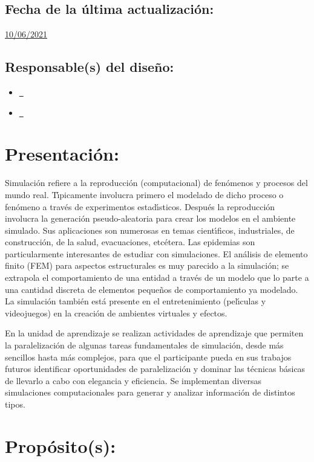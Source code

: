 \documentclass[10 pt]{article}
\begin{document}
\subsection{Fecha de la \'{u}ltima actualizaci\'{o}n:} \underline{10/06/2021}
\subsection{Responsable(s) del dise\~{n}o:}
\begin{itemize}[label={}]
\item \underline{\nsara~\sara}
\item \underline{\nelisa~\elisa}
\end{itemize}
\newpage
\section{Presentaci\'{o}n:}

Simulaci\'{o}n refiere a la reproducci\'{o}n (computacional) de
fen\'{o}menos y procesos del mundo real. T\'{\i}picamente involucra
primero el modelado de dicho proceso o fen\'{o}meno a trav\'{e}s de
experimentos estad\'{\i}sticos. Despu\'{e}s la reproducci\'{o}n
involucra la generaci\'{o}n pseudo-aleatoria para crear los modelos en
el ambiente simulado. Sus aplicaciones son numerosas en temas
cient\'{\i}ficos, industriales, de construcci\'{o}n, de la salud,
evacuaciones, etc\'{e}tera. Las epidemias son particularmente
interesantes de estudiar con simulaciones. El an\'{a}lisis de elemento
finito (FEM) para aspectos estructurales es muy parecido a la
simulaci\'{o}n; se extrapola el comportamiento de una entidad a
trav\'{e}s de un modelo que lo parte a una cantidad discreta de
elementos peque\~{n}os de comportamiento ya modelado. La
simulaci\'{o}n tambi\'{e}n est\'{a} presente en el entretenimiento
(pel\'{\i}culas y videojuegos) en la creaci\'{o}n de ambientes
virtuales y efectos.

En la unidad de aprendizaje se realizan actividades de aprendizaje que
permiten la paralelizaci\'{o}n de algunas tareas fundamentales de
simulaci\'{o}n, desde m\'{a}s sencillos hasta m\'{a}s complejos, para
que el participante pueda en sus trabajos futuros identificar
oportunidades de paralelizaci\'{o}n y dominar las t\'{e}cnicas
b\'{a}sicas de llevarlo a cabo con elegancia y eficiencia. Se
implementan diversas simulaciones computacionales para generar y
analizar informaci\'{o}n de distintos tipos.

\section{Prop\'{o}sito(s):}
\end{document}
